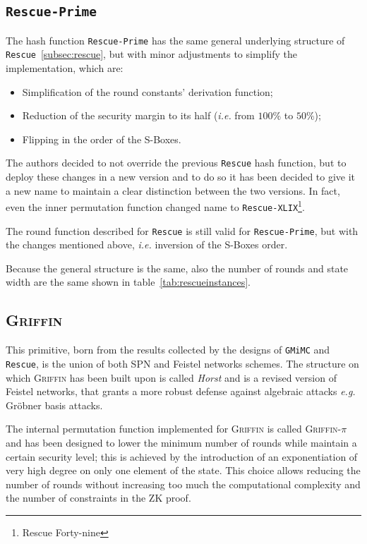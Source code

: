 \documentclass[12pt, a4paper]{report}
\begin{document}
\subsection{\texttt{Rescue-Prime}}\label{subsec:rescueprime}

The hash function \texttt{Rescue-Prime} has the same general underlying structure of \texttt{Rescue}~\ref{subsec:rescue}, but with minor adjustments to simplify the implementation, which are:
\begin{itemize}
  \item Simplification of the round constants' derivation function;
  \item Reduction of the security margin to its half (\textsl{i.e.} from $100\%$ to $50\%$);
  \item Flipping in the order of the S-Boxes.
\end{itemize}

The authors decided to not override the previous \texttt{Rescue} hash function, but to deploy these changes in a new version and to do so it has been decided to give it a new name to maintain a clear distinction between the two versions.
In fact, even the inner permutation function changed name to \texttt{Rescue-XLIX}\footnote{Rescue Forty-nine}.

The round function described for \texttt{Rescue} is still valid for \texttt{Rescue-Prime}, but with the changes mentioned above, \textsl{i.e.} inversion of the S-Boxes order.

Because the general structure is the same, also the number of rounds and state width are the same shown in table~\ref{tab:rescueinstances}.

\subsection{\textsc{Griffin}}\label{subsec:griffin}

This primitive, born from the results collected by the designs of \texttt{GMiMC} and \texttt{Rescue}, is the union of both SPN and Feistel networks schemes.
The structure on which \textsc{Griffin} has been built upon is called \textit{Horst} and is a revised version of Feistel networks, that grants a more robust defense against algebraic attacks \textsl{e.g.} Gr\"obner basis attacks.

The internal permutation function implemented for \textsc{Griffin} is called \textsc{Griffin-$\pi$} and has been designed to lower the minimum number of rounds while maintain a certain security level; this is achieved by the introduction of an exponentiation of very high degree on only one element of the state. This choice allows reducing the number of rounds without increasing too much the computational complexity and the number of constraints in the ZK proof.
\end{document}
